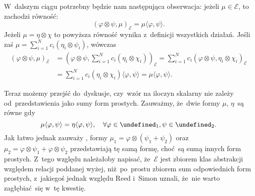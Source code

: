 \documentclass[a4paper,11pt]{article}
\newcommand{\mc}{\mathcal}
\newcommand{\vp}{\varphi}
\let\H\undefined
\newcommand{\H}{\mc{H}}
\newcommand{\ot}{\otimes}
\newcommand{\Sum}{\sum\limits}
\newcommand{\lket}{\langle}
\newcommand{\rket}{\rangle}
\begin{document}
W~dalszym ciągu potrzebny %
będzie nam następująca obserwacja: jeżeli $\mu \in \mc{E}$, to
zachodzi równość:
\begin{displaymath}
  ( \vp \ot \psi, \mu )_{ \mc{E} } = \mu\lket \vp, \psi \rket.
\end{displaymath}
Jeżeli $\mu = \eta \ot \chi$ to powyższa równość wynika z~definicji
wszystkich działań. Jeśli zaś
$\mu = \Sum_{ i = 1 }^{ N } c_{ i } ( \eta_{ i } \ot \psi_{ i } )$,
wówczas
\begin{displaymath}
  \begin{split}
    ( \vp \ot \psi, \mu )_{ \mc{E} } &= \left( \vp \ot \psi, \Sum_{ i
        = 1 }^{ N } c_{ i } ( \eta_{ i } \ot \chi_{ i } ) \right)_{
      \mc{E} } = \Sum_{ i = 1 }^{ N } c_{ i } ( \vp \ot \psi,
    \eta_{ i } \ot \chi_{ i } )_{ \mc{E} } \\
    &= \Sum_{ i = 1 }^{ N } c_{ i } ( \eta_{ i } \ot \chi_{ i } )
    \lket \vp, \psi \rket = \mu\lket \vp, \psi \rket.
  \end{split}
\end{displaymath}

Teraz możemy przejść do~dyskusje, %
czy~wzór na iloczyn skalarny nie zależy od~przedstawienia jako sumy
form prostych. Zauważmy, że~dwie formy $\mu$, $\eta$~są równe gdy
\begin{displaymath}
  \mu\lket \vp, \psi \rket = \eta\lket \vp, \psi \rket,
  \quad \forall \vp \in \H_{ 1 }, \psi \in \H_{ 2 }.
\end{displaymath}
Jak łatwo jednak zauważy %
, formy $\mu_{ 1 } = \vp \ot ( \psi_{ 1 } + \psi_{ 2 } )$
oraz~$\mu_{ 2 } = \vp \ot \psi_{ 1 } + \vp \ot \psi_{ 2 }$
przedstawiają tę samą formę, choć~są sumą innych form prostych. Z~tego
względu należałoby napisać, że~$\mc{E}$ jest zbiorem klas abstrakcji
względem relacji poddanej wyżej, niż~po~prostu zbiorem sum
odpowiednich form prostych, z~jakiegoś jednak względu Reed i~Simon
uznali, że~nie warto zagłębiać~się w~tę kwestię.
\end{document}
